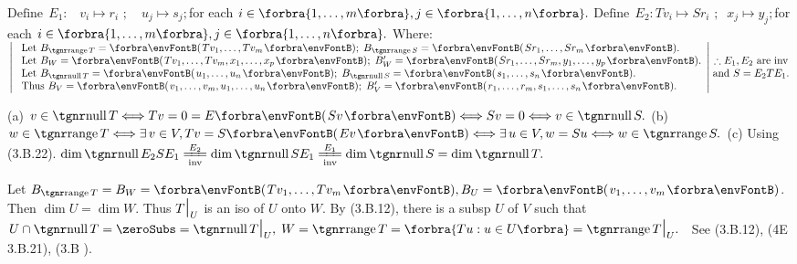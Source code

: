 $\text{Define}\;\,E_1:\,\,\,\,\, v_i\mapsto r_i\,\,;\quad u_j\mapsto s_j;$\quad for each $i\in\Bra{1,\dots,m},j\in\Bra{1,\dots,n}.$\parSol{}
$\text{Define}\;\,E_2:Tv_i\mapsto Sr_i\,\,;\;\;x_j\mapsto y_j;$\quad for each $i\in\Bra{1,\dots,m},j\in\Bra{1,\dots,n}.$
Where:\parSol{\vspace{6pt}}
$\MathLeftrightMid{l}{$
	Let $B_{\range T}=\Par{Tv_1,\dots,Tv_m};\;B_{\range S}=\Par{Sr_1,\dots,Sr_m}.\\ $
	Let $B_W=\Par{Tv_1,\dots,Tv_m,x_1,\dots,x_p};\;B_W'=\Par{Sr_1,\dots,Sr_m,y_1,\dots,y_p}.\\ $
	Let $B_{\null T}=\Par{u_1,\dots,u_n};\;B_{\null S}=\Par{s_1,\dots,s_n}.\\ $
	Thus $B_V=\Par{v_1,\dots,v_m,u_1,\dots,u_n};\;B_V'=\Par{r_1,\dots,r_m,s_1,\dots,s_n}.}\hMath{c}{}{}{\therefore E_1,E_2$ are inv$ \\ $and $S=E_2 TE_1.}$\PfEnd
\SepLine[0pt][\Blind{\BulletPointX} ]

(a) $v\in\null T\Longleftrightarrow Tv=0=E\Par{Sv}\Longleftrightarrow Sv=0\Longleftrightarrow v\in\null S.$\parSol{}
(b) $w\in\range T\Longleftrightarrow\exists\,v\in V,Tv=S\Par{Ev}\Longleftrightarrow\exists\,u\in V,w=Su\Longleftrightarrow w\in\range S.$\parSol{}
(c) Using (3.B.22). $\dim\null E_2SE_1\xlongequal[\text{inv}]{E_2}\dim\null SE_1\xlongequal[\text{inv}]{E_1}\dim\null S=\dim\null T.$\PfEnd
\SepLine

Let $B_{\range T}=B_W=\Par{Tv_1,\dots,Tv_m},B_U=\Par{v_1,\dots,v_m}$.\parSol{}
Then $\dim U=\dim W.$ Thus $T\text{\Large|}_U$ is an iso of $U$ onto $W.$\PfEnd\parSol{\vspace{4pt}}
\Or By (3.B.12), there is a subsp $U$ of $V$ such that\parSol{}
$U\cap \null T=\zeroSubs=\null T\mmid_U,\;W=\range T=\Bra{Tu:u\in U}=\range T\mmid_U.$\PfEnd\vspace{4pt}
\Comment \,\,\,See (3.B.12), (4E 3.B.21), (3.B \TIPS).\vspace{-2pt}
\SepLine\pagebreak

